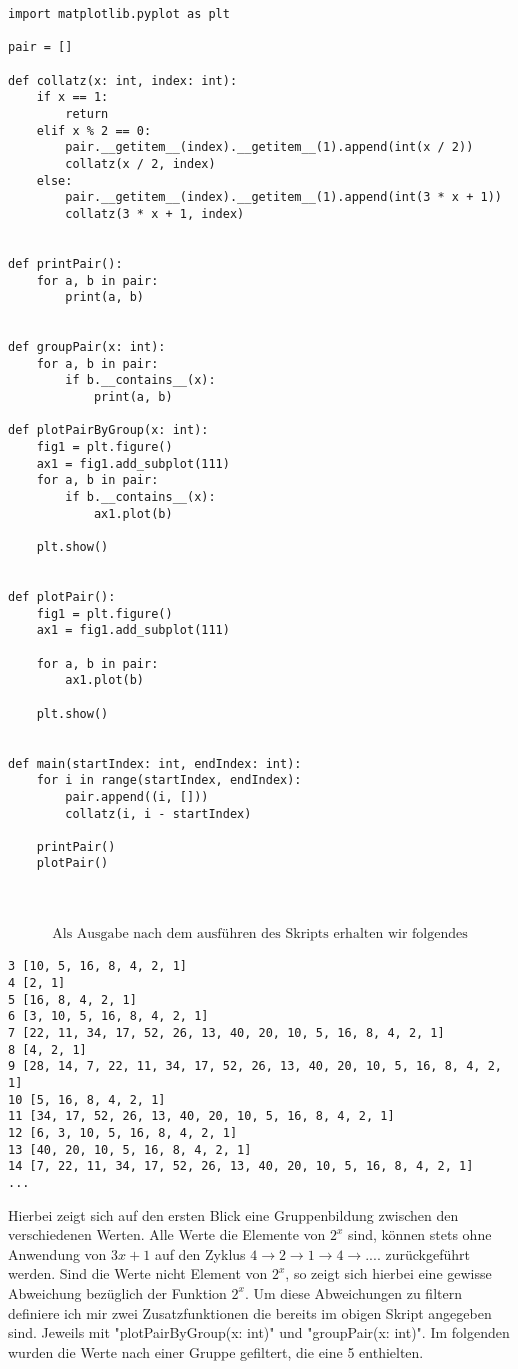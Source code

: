 \documentclass{article}
\begin{document}
\begin{verbatim}
import matplotlib.pyplot as plt

pair = []

def collatz(x: int, index: int):
    if x == 1:
        return
    elif x % 2 == 0:
        pair.__getitem__(index).__getitem__(1).append(int(x / 2))
        collatz(x / 2, index)
    else:
        pair.__getitem__(index).__getitem__(1).append(int(3 * x + 1))
        collatz(3 * x + 1, index)


def printPair():
    for a, b in pair:
        print(a, b)


def groupPair(x: int):
    for a, b in pair:
        if b.__contains__(x):
            print(a, b)

def plotPairByGroup(x: int):
    fig1 = plt.figure()
    ax1 = fig1.add_subplot(111)
    for a, b in pair:
        if b.__contains__(x):
            ax1.plot(b)

    plt.show()


def plotPair():
    fig1 = plt.figure()
    ax1 = fig1.add_subplot(111)

    for a, b in pair:
        ax1.plot(b)

    plt.show()


def main(startIndex: int, endIndex: int):
    for i in range(startIndex, endIndex):
        pair.append((i, []))
        collatz(i, i - startIndex)

    printPair()
    plotPair()
\end{verbatim}
\\\\
\noindent \begin{align*}
\text{Als Ausgabe nach dem ausführen des Skripts erhalten wir folgendes}
\end{align*}
\begin{verbatim}
3 [10, 5, 16, 8, 4, 2, 1]
4 [2, 1]
5 [16, 8, 4, 2, 1]
6 [3, 10, 5, 16, 8, 4, 2, 1]
7 [22, 11, 34, 17, 52, 26, 13, 40, 20, 10, 5, 16, 8, 4, 2, 1]
8 [4, 2, 1]
9 [28, 14, 7, 22, 11, 34, 17, 52, 26, 13, 40, 20, 10, 5, 16, 8, 4, 2, 1]
10 [5, 16, 8, 4, 2, 1]
11 [34, 17, 52, 26, 13, 40, 20, 10, 5, 16, 8, 4, 2, 1]
12 [6, 3, 10, 5, 16, 8, 4, 2, 1]
13 [40, 20, 10, 5, 16, 8, 4, 2, 1]
14 [7, 22, 11, 34, 17, 52, 26, 13, 40, 20, 10, 5, 16, 8, 4, 2, 1]
...
\end{verbatim}
\noindent Hierbei zeigt sich auf den ersten Blick eine Gruppenbildung zwischen den verschiedenen Werten. Alle Werte die Elemente von $2^x$ sind, können stets ohne Anwendung von $3x+1$ auf den Zyklus $4 \rightarrow 2 \rightarrow 1 \rightarrow 4 \rightarrow ...$. zurückgeführt werden. Sind die Werte nicht Element von $2^x$, so zeigt sich hierbei eine gewisse Abweichung bezüglich der Funktion $2^x$. Um diese Abweichungen zu filtern definiere ich mir zwei Zusatzfunktionen die bereits im obigen Skript angegeben sind. Jeweils mit "plotPairByGroup(x: int)" und "groupPair(x: int)". Im folgenden wurden die Werte nach einer Gruppe gefiltert, die eine 5 enthielten.
\end{document}
